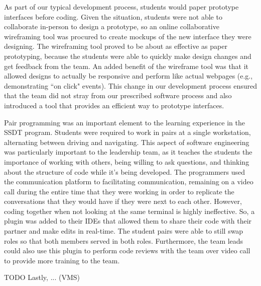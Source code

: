 As part of our typical development process, students would paper prototype interfaces before coding. Given the situation, students were not able to collaborate in-person to design a prototype, so an online collaborative wireframing tool was procured to create mockups of the new interface they were designing. The wireframing tool proved to be about as effective as paper prototyping, because the students were able to quickly make design changes and get feedback from the team. An added benefit of the wireframe tool was that it allowed designs to actually be responsive and perform like actual webpages (e.g., demonstrating ``on click" events). This change in our development process ensured that the team did not stray from our prescribed software process and also introduced a tool that provides an efficient way to prototype interfaces.

Pair programming was an important element to the learning experience in the SSDT program. Students were required to work in pairs at a single workstation, alternating between driving and navigating. This aspect of software engineering was particularly important to the leadership team, as it teaches the students the importance of working with others, being willing to ask questions, and thinking about the structure of code while it's being developed. The programmers used the communication platform to facilitating communication, remaining on a video call during the entire time that they were working in order to replicate the conversations that they would have if they were next to each other. However, coding together when not looking at the same terminal is highly ineffective. So, a plugin was added to their IDEs that allowed them to share their code with their partner and make edits in real-time. The student pairs were able to still swap roles so that both members served in both roles. Furthermore, the team leads could also use this plugin to perform code reviews with the team over video call to provide more training to the team.

TODO Lastly, ... (VMS)


